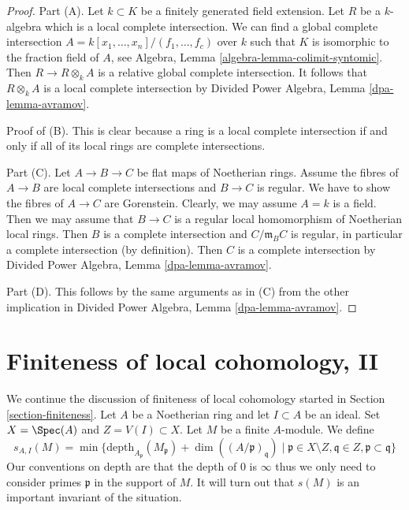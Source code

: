 \begin{proof}
Part (A). Let $k \subset K$ be a finitely generated field extension.
Let $R$ be a $k$-algebra which is a local complete intersection.
We can find a global complete intersection
$A = k[x_1, \ldots, x_n]/(f_1, \ldots, f_c)$
over $k$ such that $K$ is isomorphic to the fraction field of $A$, see
Algebra, Lemma \ref{algebra-lemma-colimit-syntomic}.
Then $R \to R \otimes_k A$ is a relative global complete intersection.
It follows that $R \otimes_k A$ is a local complete intersection
by Divided Power Algebra, Lemma \ref{dpa-lemma-avramov}.

\medskip\noindent
Proof of (B). This is clear
because a ring is a local complete intersection if and only if all of its
local rings are complete intersections.

\medskip\noindent
Part (C). Let $A \to B \to C$ be flat maps of Noetherian rings.
Assume the fibres of $A \to B$ are local complete intersections
and $B \to C$ is regular. We have to show the fibres of $A \to C$
are Gorenstein. Clearly, we may assume $A = k$ is a field.
Then we may assume that $B \to C$ is a regular local homomorphism
of Noetherian local rings. Then $B$ is a complete intersection and
$C/\mathfrak m_B C$ is regular, in particular a complete intersection
(by definition). Then $C$ is a complete intersection by
Divided Power Algebra, Lemma \ref{dpa-lemma-avramov}.

\medskip\noindent
Part (D). This follows by the same arguments as in (C) from
the other implication in
Divided Power Algebra, Lemma \ref{dpa-lemma-avramov}.
\end{proof}







\section{Finiteness of local cohomology, II}
\label{section-finiteness-II}

\noindent
We continue the discussion of finiteness of local cohomology
started in Section \ref{section-finiteness}.
Let $A$ be a Noetherian ring and let $I \subset A$ be an ideal.
Set $X = \Spec(A)$ and $Z = V(I) \subset X$. Let $M$ be a finite $A$-module.
We define
\begin{equation}
\label{equation-cutoff}
s_{A, I}(M) =
\min \{
\text{depth}_{A_\mathfrak p}(M_\mathfrak p) + \dim((A/\mathfrak p)_\mathfrak q)
\mid
\mathfrak p \in X \setminus Z, \mathfrak q \in Z,
\mathfrak p \subset \mathfrak q
\}
\end{equation}
Our conventions on depth are that the depth of $0$ is $\infty$
thus we only need to consider primes $\mathfrak p$ in the support
of $M$. It will turn out that $s(M)$ is an important invariant of
the situation.

